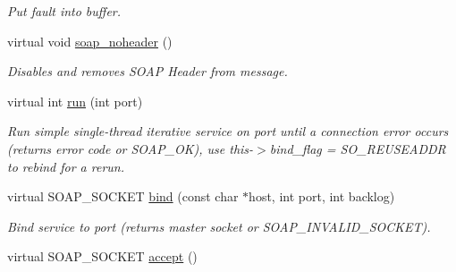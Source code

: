 \begin{DoxyCompactItemize}
\begin{DoxyCompactList}\small\item\em Put fault into buffer. \item\end{DoxyCompactList}\item 
\hypertarget{classPASSSubscriberPortBindingService_a50a9a90693afef9bec44e27200253f54}{
virtual void \hyperlink{classPASSSubscriberPortBindingService_a50a9a90693afef9bec44e27200253f54}{soap\_\-noheader} ()}
\label{classPASSSubscriberPortBindingService_a50a9a90693afef9bec44e27200253f54}

\begin{DoxyCompactList}\small\item\em Disables and removes SOAP Header from message. \item\end{DoxyCompactList}\item 
\hypertarget{classPASSSubscriberPortBindingService_a2760625c8daad0e7871b93c1929b40be}{
virtual int \hyperlink{classPASSSubscriberPortBindingService_a2760625c8daad0e7871b93c1929b40be}{run} (int port)}
\label{classPASSSubscriberPortBindingService_a2760625c8daad0e7871b93c1929b40be}

\begin{DoxyCompactList}\small\item\em Run simple single-\/thread iterative service on port until a connection error occurs (returns error code or SOAP\_\-OK), use this-\/$>$bind\_\-flag = SO\_\-REUSEADDR to rebind for a rerun. \item\end{DoxyCompactList}\item 
\hypertarget{classPASSSubscriberPortBindingService_ae0394773f63350b3a949abca52bf6d0d}{
virtual SOAP\_\-SOCKET \hyperlink{classPASSSubscriberPortBindingService_ae0394773f63350b3a949abca52bf6d0d}{bind} (const char $\ast$host, int port, int backlog)}
\label{classPASSSubscriberPortBindingService_ae0394773f63350b3a949abca52bf6d0d}

\begin{DoxyCompactList}\small\item\em Bind service to port (returns master socket or SOAP\_\-INVALID\_\-SOCKET). \item\end{DoxyCompactList}\item 
\hypertarget{classPASSSubscriberPortBindingService_a11215dfa1255ab0a63ab978014fe8b8c}{
virtual SOAP\_\-SOCKET \hyperlink{classPASSSubscriberPortBindingService_a11215dfa1255ab0a63ab978014fe8b8c}{accept} ()}
\label{classPASSSubscriberPortBindingService_a11215dfa1255ab0a63ab978014fe8b8c}


\end{DoxyCompactItemize}
